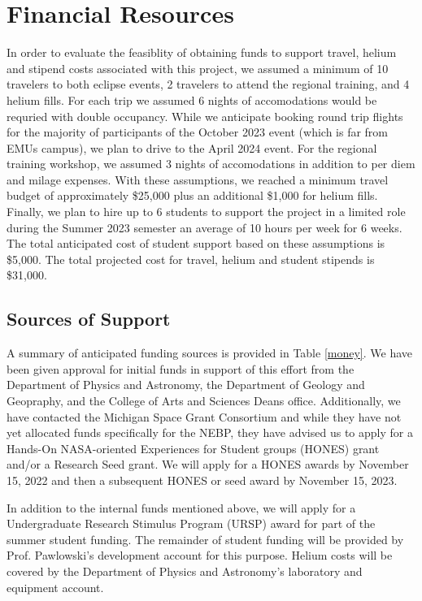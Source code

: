 \documentclass[12pt]{article}
\begin{document}
\section{Financial Resources}
In order to evaluate the feasiblity of obtaining funds to support travel,
helium and stipend costs associated with this project, we
assumed a minimum of 10 travelers to both eclipse events, 2 travelers
to attend the regional training, and 4 helium fills. For
each trip we assumed 6 nights of accomodations would be requried with
double occupancy. While we anticipate booking round trip flights for the majority
of participants of the
October 2023 event (which is far from EMUs campus), we plan
to drive to the April 2024 event. For the regional training workshop,
we assumed 3 nights of accomodations in addition to per diem and milage expenses.
With these assumptions, we reached a minimum travel budget of approximately \$25,000
plus an additional \$1,000 for helium fills.
Finally, we plan to hire up to
6 students to support the project in a limited role
during the Summer 2023 semester an average of 10 hours per week
for 6 weeks. The total anticipated cost of student support based on these assumptions is \$5,000.
The total projected cost for travel, helium and student stipends is \$31,000.

\subsection{Sources of Support}

A summary of anticipated funding sources is provided in Table \ref{money}.
We have been given approval for initial funds in support of this effort
from the Department of Physics and Astronomy, the Department of
Geology and Geopraphy, and the College of Arts and Sciences Deans office.
Additionally, we have contacted the Michigan Space Grant Consortium
and while they have not yet allocated funds specifically for the NEBP, they
have advised us to apply for a Hands-On NASA-oriented Experiences for Student groups
(HONES) grant and/or a Research Seed grant. We will apply for
a HONES awards by November 15, 2022 and then a subsequent HONES or seed award by November 15, 2023.

In addition to the internal funds mentioned above, we will apply for a Undergraduate
Research Stimulus Program (URSP) award for part of the summer student funding. The remainder
of  student funding will be provided by
Prof. Pawlowski's development account for this purpose.
Helium costs will be covered by the Department of Physics and Astronomy's laboratory
and equipment account.
\end{document}
